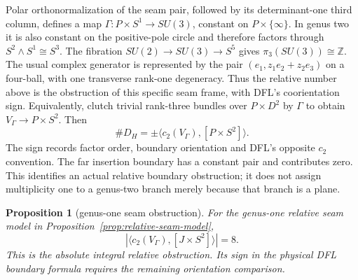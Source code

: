\documentclass[11pt]{amsart}
\newtheorem{proposition}[theorem]{Proposition}
\theoremstyle{definition}
\theoremstyle{remark}
\theoremstyle{plain}
\begin{document}
Polar orthonormalization of the seam pair, followed by its
determinant-one third column, defines a map
$\Gamma:P\times S^1\to SU(3)$, constant on
$P\times\{\infty\}$. In genus two it is also constant
on the positive-pole circle and therefore factors through
$S^2\wedge S^1\cong S^3$.
The fibration $SU(2)\to SU(3)\to S^5$ gives
$\pi_3(SU(3))\cong\mathbb Z$.
The usual complex generator is represented by the pair
$(e_1,z_1e_2+z_2e_3)$ on a four-ball, with one transverse
rank-one degeneracy. Thus the relative number above is
the obstruction of this specific seam frame, with DFL's
coorientation sign. Equivalently, clutch trivial rank-three
bundles over $P\times D^2$ by $\Gamma$ to obtain
$V_\Gamma\to P\times S^2$. Then
\begin{equation}\label{eq:seam-clutch-relative-number}
 \#D_H=\pm\langle c_2(V_\Gamma),[P\times S^2]\rangle.
\end{equation}
The sign records factor order, boundary orientation and DFL's
opposite $c_2$ convention. The far insertion boundary has a
constant pair and contributes zero. This identifies an actual
relative boundary obstruction; it does not assign multiplicity
one to a genus-two branch merely because that branch is a plane.

\begin{proposition}[genus-one seam obstruction]
\label{prop:torus-seam-obstruction}
For the genus-one relative seam model in
Proposition~\ref{prop:relative-seam-model},
\[
                 |\langle c_2(V_\Gamma),[J\times S^2]\rangle|=8.
\]
This is the absolute integral relative obstruction. Its sign
in the physical DFL boundary formula requires the remaining
orientation comparison.
\end{proposition}
\end{document}
